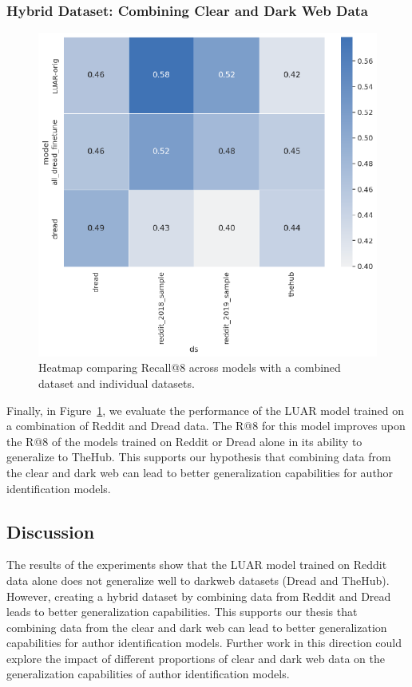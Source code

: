 \subsubsection{Hybrid Dataset: Combining Clear and Dark Web Data}
\begin{figure}
    \centering
    \includegraphics[width=0.8\linewidth]{stylometryExtensions/figures/results/rq3_combine} 
    \caption{Heatmap comparing Recall@8 across models with a combined dataset and individual datasets.}
    \label{fig:stylometry_extensions:followingTrail:results:rq3_combine}
\end{figure}

Finally, in Figure~\ref{fig:stylometry_extensions:followingTrail:results:rq3_combine}, we evaluate the performance of the LUAR model trained on a combination of Reddit and Dread data.
The R@8 for this model improves upon the R@8 of the models trained on Reddit or Dread alone in its ability to generalize to TheHub.
This supports our hypothesis that combining data from the clear and dark web can lead to better generalization capabilities for author identification models.

\subsection{Discussion}
The results of the experiments show that the LUAR model trained on Reddit data alone does not generalize well to darkweb datasets (Dread and TheHub).
However, creating a hybrid dataset by combining data from Reddit and Dread leads to better generalization capabilities.
This supports our thesis that combining data from the clear and dark web can lead to better generalization capabilities for author identification models.
Further work in this direction could explore the impact of different proportions of clear and dark web data on the generalization capabilities of author identification models.


\endinput